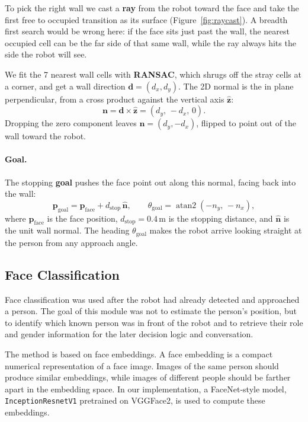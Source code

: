 \documentclass[a4paper, 11pt]{article}
\begin{document}
To pick the right wall we cast a \textbf{ray} from the robot toward the face and take the
first free to occupied transition as its surface (Figure~\ref{fig:raycast}). A breadth
first search would be wrong here: if the face sits just past the wall, the nearest
occupied cell can be the far side of that same wall, while the ray always hits the side
the robot will see.

We fit the 7 nearest wall cells with \textbf{RANSAC}, which shrugs off the stray cells at
a corner, and get a wall direction $\mathbf d=(d_x,d_y)$. The 2D normal is the in plane
perpendicular, from a cross product against the vertical axis $\hat{\mathbf z}$:
\[ \mathbf n = \mathbf d \times \hat{\mathbf z} = (d_y,\,-d_x,\,0). \]
Dropping the zero component leaves $\mathbf n=(d_y,-d_x)$, flipped to point out of the
wall toward the robot.

\paragraph{Goal.}
The stopping \textbf{goal} pushes the face point out along this normal, facing back into
the wall:
\[ \mathbf p_{\text{goal}} = \mathbf p_{\text{face}} + d_{\text{stop}}\,\hat{\mathbf n},
\qquad \theta_{\text{goal}} = \operatorname{atan2}(-n_y,\,-n_x), \]
where $\mathbf p_{\text{face}}$ is the face position, $d_{\text{stop}}=0.4$\,m is the
stopping distance, and $\hat{\mathbf n}$ is the unit wall normal. The heading
$\theta_{\text{goal}}$ makes the robot arrive looking straight at the person from any
approach angle.

\subsection{Face Classification}

Face classification was used after the robot had already detected and approached a person. The goal of this module was not to estimate the person's position, but to identify which known person was in front of the robot and to retrieve their role and gender information for the later decision logic and conversation.

The method is based on face embeddings. A face embedding is a compact numerical representation of a face image. Images of the same person should produce similar embeddings, while images of different people should be farther apart in the embedding space. In our implementation, a FaceNet-style model, \texttt{InceptionResnetV1} pretrained on VGGFace2, is used to compute these embeddings.
\end{document}
